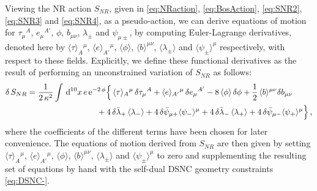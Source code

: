 \documentclass[a4paper,10pt,openany]{article}
\def\rme{\mathrm{e}}
\def\rmd{\mathrm{d}}
\begin{document}
	Viewing the NR action $S_{NR}$, given in \eqref{eq:NRaction}, \eqref{eq:BosAction}, \eqref{eq:SNR2}, \eqref{eq:SNR3} and \eqref{eq:SNR4}, as a pseudo-action, we can derive equations of motion for $\tau_\mu{}^A$, $e_\mu{}^{A'}$, $\phi$, $b_{\mu\nu}$, $\lambda_\pm$ and $\psi_{\mu \pm}$, by computing Euler-Lagrange derivatives, denoted here by $\langle \tau \rangle_A{}^\mu$, $\langle e \rangle_{A'}{}^\mu$, $\langle \phi \rangle$, $\langle b \rangle^{\mu\nu}$, $\langle \lambda_\pm \rangle$ and $\langle \psi_\pm \rangle^\mu$ respectively, with respect to these fields. Explicitly, we define these functional derivatives as the result of performing an unconstrained variation of $S_{NR}$ as follows:
	\begin{align} \label{eq:NReomvar}
		\delta\,S_{NR} = \frac{1}{2\,\kappa^2}\int\,\rmd^{10}x\,e\,&\rme^{-2\,\phi}\Big\{\,\langle\tau\rangle_A{}^\mu\,\delta\tau_\mu{}^A + \langle e\rangle_{A'}{}^\mu\,\delta e_\mu{}^{A'} - 8\,\langle\phi\rangle\,\delta\phi +\frac12\,\langle b\rangle^{\mu\nu}\delta b_{\mu\nu}\notag\\
		& \quad +4\,\delta\bar\lambda_+\,\langle\lambda_-\rangle + 4\,\delta\bar\psi_{\mu+}\langle\psi_-\rangle^\mu +4\,\delta\bar\lambda_-\,\langle\lambda_+\rangle + 4\,\delta\bar\psi_{\mu-}\langle\psi_+\rangle^\mu\Big\}\,,
	\end{align}
	where the coefficients of the different terms have been chosen for later convenience. The equations of motion derived from $S_{NR}$ are then given by setting $\langle \tau \rangle_A{}^\mu$, $\langle e \rangle_{A'}{}^\mu$, $\langle \phi \rangle$, $\langle b \rangle^{\mu\nu}$, $\langle \lambda_\pm \rangle$ and $\langle \psi_\pm \rangle^\mu$ to zero and supplementing the resulting set of equations by hand with the self-dual DSNC geometry constraints \eqref{eq:DSNC-}.
	
\end{document}
